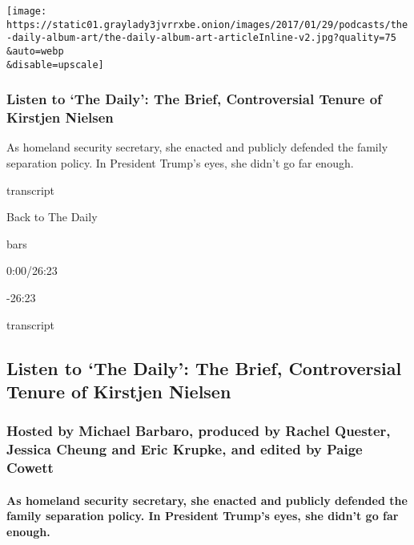 \texttt{[image: https://static01.graylady3jvrrxbe.onion/images/2017/01/29/podcasts/the-daily-album-art/the-daily-album-art-articleInline-v2.jpg?quality=75\\\&auto=webp\\\&disable=upscale]}

\hypertarget{listen-to-the-daily-the-brief-controversial-tenure-of-kirstjen-nielsen}{%
\subsubsection{Listen to `The Daily': The Brief, Controversial Tenure of
Kirstjen
Nielsen}\label{listen-to-the-daily-the-brief-controversial-tenure-of-kirstjen-nielsen}}

As homeland security secretary, she enacted and publicly defended the
family separation policy. In President Trump's eyes, she didn't go far
enough.

transcript

Back to The Daily

bars

0:00/26:23

-26:23

transcript

\hypertarget{listen-to-the-daily-the-brief-controversial-tenure-of-kirstjen-nielsen-1}{%
\subsection{Listen to `The Daily': The Brief, Controversial Tenure of
Kirstjen
Nielsen}\label{listen-to-the-daily-the-brief-controversial-tenure-of-kirstjen-nielsen-1}}

\hypertarget{hosted-by-michael-barbaro-produced-by-rachel-quester-jessica-cheung-and-eric-krupke-and-edited-by-paige-cowett}{%
\subsubsection{Hosted by Michael Barbaro, produced by Rachel Quester,
Jessica Cheung and Eric Krupke, and edited by Paige
Cowett}\label{hosted-by-michael-barbaro-produced-by-rachel-quester-jessica-cheung-and-eric-krupke-and-edited-by-paige-cowett}}

\hypertarget{as-homeland-security-secretary-she-enacted-and-publicly-defended-the-family-separation-policy-in-president-trumps-eyes-she-didnt-go-far-enough}{%
\paragraph{As homeland security secretary, she enacted and publicly
defended the family separation policy. In President Trump's eyes, she
didn't go far
enough.}\label{as-homeland-security-secretary-she-enacted-and-publicly-defended-the-family-separation-policy-in-president-trumps-eyes-she-didnt-go-far-enough}}

